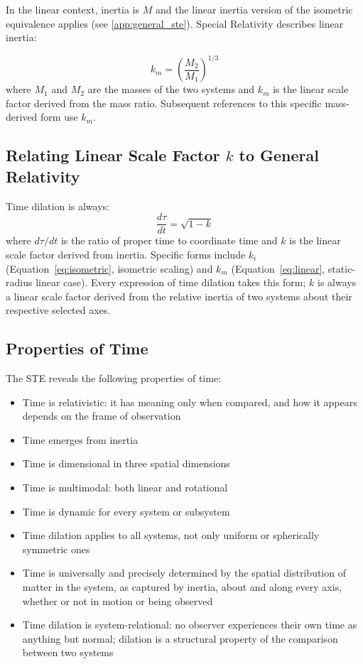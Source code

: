 \documentclass[twoside,twocolumn,9pt]{article}
\begin{document}
In the linear context, inertia is $M$ and the linear inertia version of the isometric equivalence applies (see \ref{app:general_ste}). Special Relativity describes linear inertia:

\begin{equation} \label{eq:linear}
k_m = \left(\frac{M_2}{M_1}\right)^{1/3}
\end{equation}
where $M_1$ and $M_2$ are the masses of the two systems and $k_m$ is the linear scale factor derived from the mass ratio. Subsequent references to this specific mass-derived form use $k_m$.

\subsection{Relating Linear Scale Factor $k$ to General Relativity}
Time dilation is always:
\begin{equation} \label{eq:td_k}
\frac{d\tau}{dt} = \sqrt{1 - k}
\end{equation}
where $d\tau/dt$ is the ratio of proper time to coordinate time and $k$ is the linear scale factor derived from inertia. Specific forms include $k_i$ (Equation~\ref{eq:isometric}, isometric scaling) and $k_m$ (Equation~\ref{eq:linear}, static-radius linear case). Every expression of time dilation takes this form; $k$ is always a linear scale factor derived from the relative inertia of two systems about their respective selected axes.

\subsection{Properties of Time}
The STE reveals the following properties of time:
\begin{itemize}
\item Time is relativistic: it has meaning only when compared, and how it appears depends on the frame of observation
\item Time emerges from inertia
\item Time is dimensional in three spatial dimensions
\item Time is multimodal: both linear and rotational
\item Time is dynamic for every system or subsystem
\item Time dilation applies to all systems, not only uniform or spherically symmetric ones
\item Time is universally and precisely determined by the spatial distribution of matter in the system, as captured by inertia, about and along every axis, whether or not in motion or being observed
\item Time dilation is system-relational: no observer experiences their own time as anything but normal; dilation is a structural property of the comparison between two systems
\end{itemize}
\end{document}

